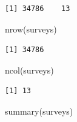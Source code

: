 \documentclass[
  letterpaper,
  DIV=11,
  numbers=noendperiod]{scrreprt}
\newenvironment{Shaded}{\begin{snugshade}}{\end{snugshade}}
\newcommand{\FunctionTok}[1]{\textcolor[rgb]{0.28,0.35,0.67}{#1}}
\newcommand{\NormalTok}[1]{\textcolor[rgb]{0.00,0.23,0.31}{#1}}
\begin{document}
\begin{verbatim}
[1] 34786    13
\end{verbatim}

\begin{Shaded}
\begin{Highlighting}[]
\FunctionTok{nrow}\NormalTok{(surveys)}
\end{Highlighting}
\end{Shaded}

\begin{verbatim}
[1] 34786
\end{verbatim}

\begin{Shaded}
\begin{Highlighting}[]
\FunctionTok{ncol}\NormalTok{(surveys)}
\end{Highlighting}
\end{Shaded}

\begin{verbatim}
[1] 13
\end{verbatim}

\begin{Shaded}
\begin{Highlighting}[]
\FunctionTok{summary}\NormalTok{(surveys)}
\end{Highlighting}
\end{Shaded}
\end{document}
